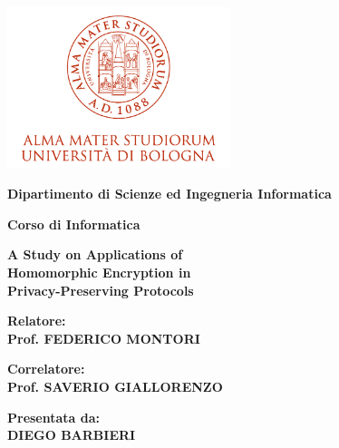 \documentclass[12pt,a4paper,twoside]{book}
\begin{document}
\pagestyle{empty}

\begin{titlepage}

\begin{center}

\includegraphics[width=6.5cm,height=4.7cm]{img/marchio-di-ateneo.png}

\vspace{10mm}

{\large{\bf{Dipartimento di Scienze ed Ingegneria Informatica}}}

\vspace{5mm}

{\Large{\bf{Corso di Informatica}}}

\vspace{15mm}

{\Huge{\bf A Study on Applications of }}\\
\vspace{3mm}
{\Huge{\bf Homomorphic Encryption in }}\\
\vspace{3mm}
{\Huge{\bf Privacy-Preserving Protocols}} \\

\end{center}

\vspace{10mm}

\begin{minipage}[t]{0.50\textwidth}
{\large{\bf Relatore: \\ Prof. FEDERICO MONTORI}}

\vspace{3mm}

{\large{\bf Correlatore: \\ Prof. SAVERIO GIALLORENZO}}
\end{minipage}
\hfill
\begin{minipage}[t]{0.40\textwidth}\raggedleft
{\large{\bf Presentata da: \\ DIEGO BARBIERI}}
\end{minipage}


\end{titlepage}
\end{document}
